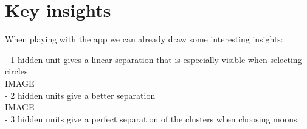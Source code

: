 \section{Key insights}

When playing with the app we can already draw some interesting insights:

- 1 hidden unit gives a linear separation that is especially visible when selecting circles. \\

IMAGE \\

- 2 hidden units give a better separation \\

IMAGE \\

- 3 hidden units give a perfect separation of the clusters when choosing moons.